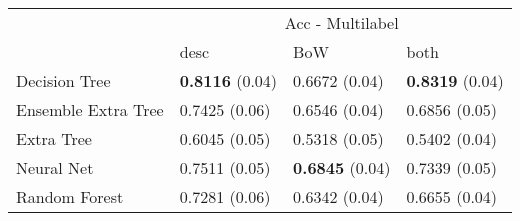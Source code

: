 \begin{tabular}{|l|l|l|l| }
\hline
 &  \multicolumn{3}{c|}{Acc - Multilabel} \\
\cline{2-4} & desc & BoW & both \\ \hline
Decision Tree       & {\bf 0.8116} (0.04) & 0.6672 (0.04) & {\bf 0.8319} (0.04)\\
Ensemble Extra Tree & 0.7425 (0.06) & 0.6546 (0.04) & 0.6856 (0.05)\\
Extra Tree          & 0.6045 (0.05) & 0.5318 (0.05) & 0.5402 (0.04)\\
Neural Net          & 0.7511 (0.05) & {\bf 0.6845} (0.04) & 0.7339 (0.05)\\
Random Forest       & 0.7281 (0.06) & 0.6342 (0.04) & 0.6655 (0.04)\\
\hline
\end{tabular}